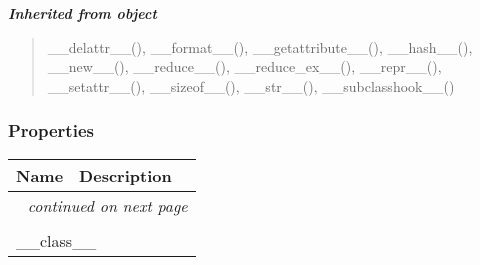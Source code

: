 \large{\textbf{\textit{Inherited from object}}}

\begin{quote}
\_\_delattr\_\_(), \_\_format\_\_(), \_\_getattribute\_\_(), \_\_hash\_\_(), \_\_new\_\_(), \_\_reduce\_\_(), \_\_reduce\_ex\_\_(), \_\_repr\_\_(), \_\_setattr\_\_(), \_\_sizeof\_\_(), \_\_str\_\_(), \_\_subclasshook\_\_()
\end{quote}


  \subsubsection{Properties}

    \vspace{-1cm}
\hspace{\varindent}\begin{longtable}{|p{\varnamewidth}|p{\vardescrwidth}|l}
\cline{1-2}
\cline{1-2} \centering \textbf{Name} & \centering \textbf{Description}& \\
\cline{1-2}
\endhead\cline{1-2}\multicolumn{3}{r}{\small\textit{continued on next page}}\\\endfoot\cline{1-2}
\endlastfoot\multicolumn{2}{|l|}{\textit{Inherited from object}}\\
\multicolumn{2}{|p{\varwidth}|}{\raggedright \_\_class\_\_}\\
\cline{1-2}
\end{longtable}

